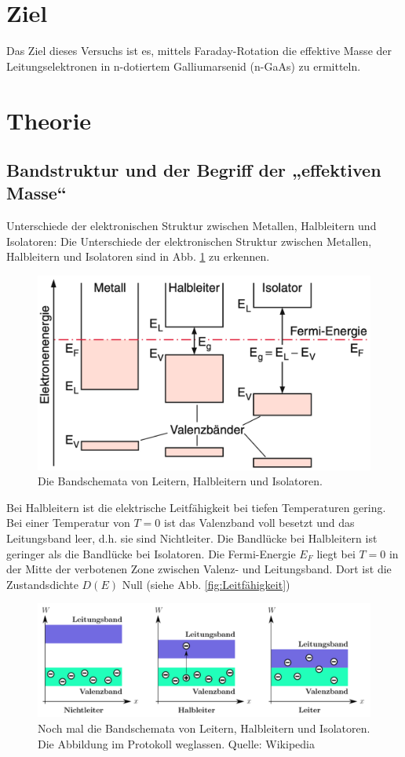 \section{Ziel}
Das Ziel dieses Versuchs ist es, mittels Faraday-Rotation die effektive Masse der Leitungselektronen in n-dotiertem Galliumarsenid (n-GaAs) zu ermitteln.

\section{Theorie}
\label{sec:Theorie_alt}

\subsection{Bandstruktur und der Begriff der „effektiven Masse“}
Unterschiede der elektronischen Struktur zwischen Metallen, Halbleitern und Isolatoren:
Die Unterschiede der elektronischen Struktur zwischen Metallen, Halbleitern und Isolatoren sind in Abb. \ref{fig:Bandschemata} zu erkennen.
\begin{figure}
    \centering
    \includegraphics[width=12cm]{fotos/Bandschemata.png}
    \caption{Die Bandschemata von Leitern, Halbleitern und Isolatoren. \cite{demtroeder}}
    \label{fig:Bandschemata}
\end{figure}
Bei Halbleitern ist die elektrische Leitfähigkeit bei tiefen Temperaturen gering. Bei einer Temperatur von $T = \num{0}$ ist das Valenzband voll besetzt und das Leitungsband leer, d.h. sie sind Nichtleiter. Die Bandlücke bei Halbleitern ist geringer als die Bandlücke bei Isolatoren. \cite{demtroeder}
Die Fermi-Energie $E_F$ liegt bei $T = \num{0}$ in der Mitte der verbotenen Zone zwischen Valenz- und Leitungsband. Dort ist die Zustandsdichte $D(E)$ Null (siehe Abb. \ref{fig:Leitfähigkeit})

\begin{figure}
    \centering
    \includegraphics[width=12cm]{fotos/Bandschemata2.png}
    \caption{Noch mal die Bandschemata von Leitern, Halbleitern und Isolatoren. Die Abbildung im Protokoll weglassen. Quelle: Wikipedia}
    \label{fig:Bandschemata2}
\end{figure}

